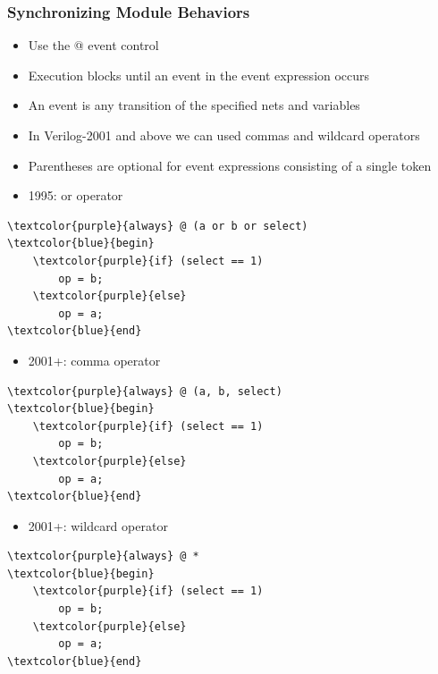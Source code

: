 \documentclass[t, notes]{beamer}
\begin{document}
\begin{frame}[fragile]
\frametitle{Synchronizing Module Behaviors}

\begin{multicols}{2}
\begin{itemize}
\item Use the @ event control
\item Execution blocks until an event in the event expression occurs
\item An event is any transition of the specified nets and variables
\item In Verilog-2001 and above we can used commas and wildcard operators
\item Parentheses are optional for event expressions consisting of a single token
\end{itemize}

\columnbreak
\begin{itemize}
\item 1995: or operator
\end{itemize}
{\tiny%
\begin{Verbatim}[commandchars=\\\{\}, tabsize=2]
\textcolor{purple}{always} @ (a or b or select)
\textcolor{blue}{begin}
	\textcolor{purple}{if} (select == 1)
		op = b;
	\textcolor{purple}{else}
		op = a;
\textcolor{blue}{end}
\end{Verbatim}
}
\begin{itemize}
\item 2001+: comma operator
\end{itemize}
{\tiny%
\begin{Verbatim}[commandchars=\\\{\}, tabsize=2]
\textcolor{purple}{always} @ (a, b, select)
\textcolor{blue}{begin}
	\textcolor{purple}{if} (select == 1)
		op = b;
	\textcolor{purple}{else}
		op = a;
\textcolor{blue}{end}
\end{Verbatim}
}
\begin{itemize}
\item 2001+: wildcard operator
\end{itemize}
{\tiny%
\begin{Verbatim}[commandchars=\\\{\}, tabsize=2]
\textcolor{purple}{always} @ *
\textcolor{blue}{begin}
	\textcolor{purple}{if} (select == 1)
		op = b;
	\textcolor{purple}{else}
		op = a;
\textcolor{blue}{end}
\end{Verbatim}
}
\end{multicols}
\end{frame}
\end{document}
